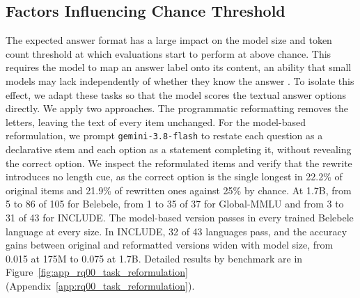 \subsection{Factors Influencing Chance Threshold}
\label{subsec:rq1_factors}

The expected answer format has a large impact on the model size and token count threshold at which evaluations start to perform at above chance. 
 This requires the model to map an answer label onto its content, an ability that small models may lack independently of whether they know the answer \citep{khatun_study_2024, madaan_quantifying_2024}.
To isolate this effect, we adapt these tasks so that the model scores the textual answer options directly.
We apply two approaches. The programmatic reformatting removes the letters, leaving the text of every item unchanged.
For the model-based reformulation, we prompt \texttt{gemini-3.8-flash} \citep{gemini_team_gemini_2024} to restate each question as a declarative stem and each option as a statement completing it, without revealing the correct option.
We inspect the reformulated items and verify that the rewrite introduces no length cue, as the correct option is the single longest in 22.2\% of original items and 21.9\% of rewritten ones against 25\% by chance.
At 1.7B,  from 5 to 86 of 105 for Belebele, from 1 to 35 of 37 for Global-MMLU and from 3 to 31 of 43 for INCLUDE. The model-based version passes in every trained Belebele language at every size. In INCLUDE, 32 of 43 languages pass, and the accuracy gains between original and reformatted versions widen with model size, from 0.015 at 175M to 0.075 at 1.7B.  Detailed results by benchmark are in Figure~\ref{fig:app_rq00_task_reformulation} (Appendix~\ref{app:rq00_task_reformulation}).

